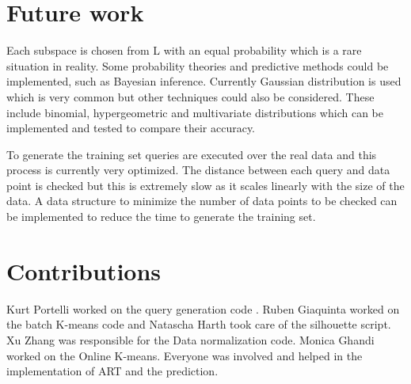 \documentclass{lmproj}
\begin{document}
\section{Future work}

Each subspace is chosen from L with an equal probability which is a rare situation in reality. Some probability theories and predictive methods could be implemented, such as Bayesian inference. Currently Gaussian distribution is used which is very common but other techniques could also be considered. These include binomial, hypergeometric and multivariate distributions which can be implemented and tested to compare their accuracy.

To generate the training set queries are executed over the real data and this process is currently very optimized. The distance between each query and data point is checked but this is extremely slow as it scales linearly with the size of the data. A data structure to minimize the number of data points to be checked can be implemented to reduce the time to generate the training set.

\section{Contributions}
Kurt Portelli worked on the 
query generation code 
. Ruben Giaquinta worked on the batch K-means code and %
Natascha Harth took care of the 
silhouette script. Xu Zhang was responsible for the 
Data normalization code. Monica Ghandi worked on the Online K-means. Everyone was involved and helped in the implementation of ART and the prediction. %


\end{document}
